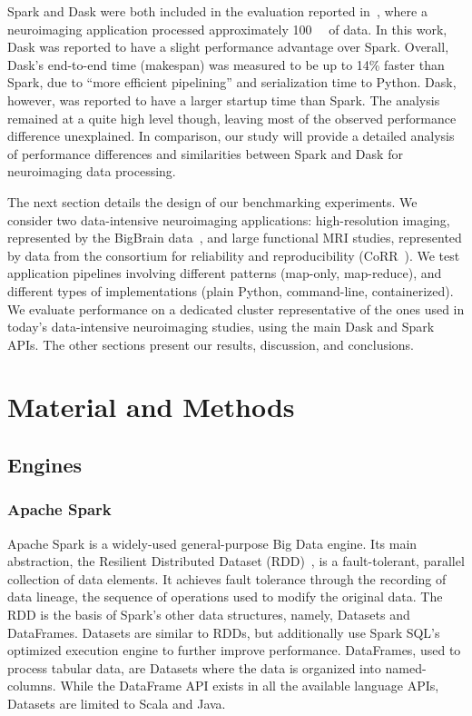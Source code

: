 \documentclass[conference]{IEEEtran}
\begin{document}
Spark and Dask were both included in the evaluation reported
in~\cite{Mehta:17}, where a neuroimaging application
processed approximately \SI{100}{\giga\byte} of data. In this work, Dask was
reported to have a slight performance advantage over Spark. Overall, Dask's
end-to-end time (makespan) was measured to be up to 14\% faster than Spark,
due to ``more efficient pipelining'' %
and serialization time to
Python. %
Dask, however, was reported to have a larger startup
time than Spark. %
The analysis remained at a quite high level
though, leaving most of the observed performance difference unexplained. In
comparison, our study will provide a detailed analysis of performance
differences and similarities between Spark and Dask for neuroimaging data processing.

The next section details the design of our benchmarking experiments. We consider two
data-intensive neuroimaging applications: high-resolution imaging,
represented by the BigBrain data~\cite{Amunts:13}, and large functional
MRI studies, represented by data from the consortium for reliability and
reproducibility (CoRR~\cite{zuo2014open}). We test application pipelines
involving different patterns (map-only, map-reduce), and different types of
implementations (plain Python, command-line,
containerized). We evaluate performance on a dedicated cluster
representative of the ones used in today's data-intensive neuroimaging
studies, using the main Dask and Spark APIs. The other sections present
our results, discussion, and conclusions.



\section{Material and Methods}

\subsection{Engines}

\subsubsection{Apache Spark} Apache Spark is a widely-used 
general-purpose Big Data engine. Its main abstraction, the Resilient Distributed
Dataset (RDD)~\cite{RDD}, is a fault-tolerant, parallel collection of data elements.
It achieves fault tolerance through the recording of data lineage, the sequence of
operations used to modify the original data. The RDD is the basis of Spark's other
data structures, namely, Datasets and DataFrames. Datasets are similar to RDDs, but
additionally use Spark SQL's optimized execution engine to further improve
performance. DataFrames, used to process tabular data, are Datasets where the data is
organized into named-columns. While the DataFrame API exists in all the available
language APIs, Datasets are limited to Scala and Java.
\end{document}
